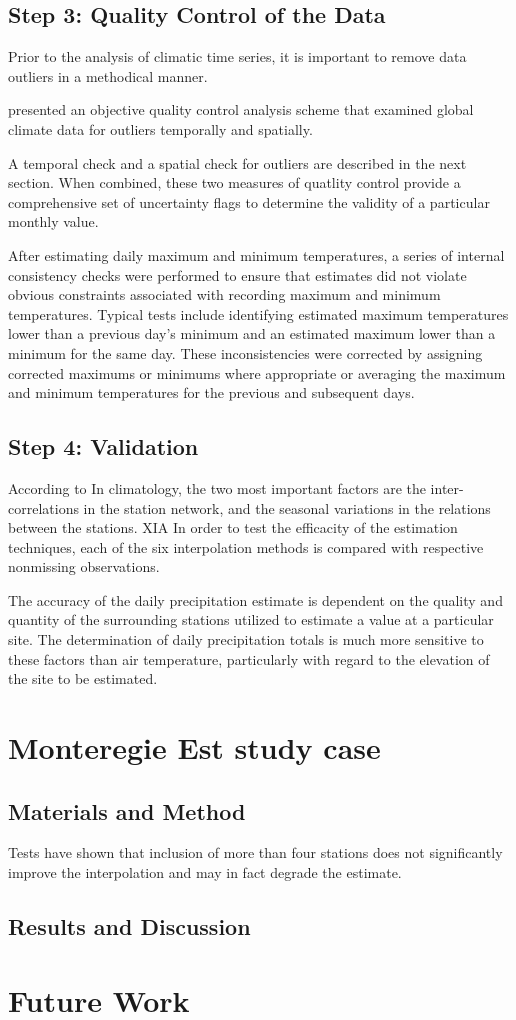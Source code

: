 \documentclass[WHATMANUAL.tex]{subfiles}
\begin{document}
\subsection{Step 3: Quality Control of the Data}

Prior to the analysis of climatic time series, it is important to remove data outliers in a methodical manner.

\cite{eischeid_quality_1995} presented an objective quality control analysis scheme that examined global climate data for outliers temporally and spatially.

A temporal check and a spatial check for outliers are described in the next section. When combined, these two measures of quatlity control provide a comprehensive set of uncertainty flags to determine the validity of a particular monthly value.

After estimating daily maximum and minimum temperatures, a series of internal consistency checks were
performed to ensure that estimates did not violate obvious constraints associated with recording maximum
and minimum temperatures. Typical tests include identifying estimated maximum temperatures lower than a
previous day’s minimum and an estimated maximum lower than a minimum for the same day. These inconsistencies were corrected by assigning corrected maximums or minimums where appropriate
or averaging the maximum and minimum temperatures for the previous and subsequent days.

\subsection{Step 4: Validation}

According to \cite{xia_forest_1999}
In climatology, the two most important factors are the inter-correlations in the station network, and the seasonal variations in the relations between the stations. {XIA}
In order to test the efficacity of the estimation techniques, each of the six interpolation methods is compared with respective nonmissing observations.

The accuracy of the daily precipitation estimate is dependent on the quality and quantity of the surrounding stations utilized to estimate a value at a particular site. The determination of daily precipitation totals is much more sensitive to these factors than air temperature, particularly with regard to the elevation of the site to be estimated.

\section{Monteregie Est study case}

\subsection{Materials and Method}

Tests have shown that inclusion of more than four stations does not significantly improve the interpolation and may in fact degrade the estimate. 

\subsection{Results and Discussion}

\section{Future Work}
\end{document}
